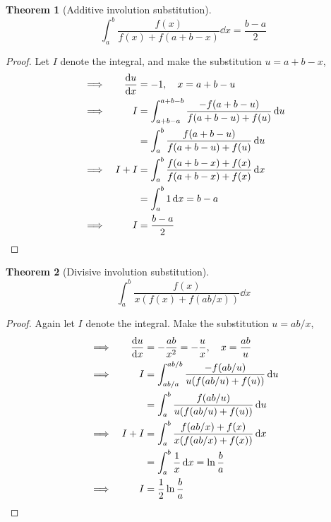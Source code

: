 \documentclass[fleqn,a4paper,11pt]{article}
\newtheorem{theorem}{Theorem}[section]
\begin{document}
    \begin{theorem}[Additive involution substitution]
    \begin{equation*}
    \int_a^b \frac{f(x)}{f(x) + f(a + b - x)} \dd{x} = \frac{b - a} 2
    \end{equation*}
    \end{theorem}
    \begin{proof}
    Let \(I\) denote the integral, and make the substitution \(u = a + b - x\),
    \begin{alignat*}{2}
    &\implies& \dv{u}{x} &= -1, \quad x = a + b - u \\
    &\implies& I &= \int_{a + b - a}^{a + b - b}
                        \frac{-f(a + b - u)}{f(a + b - u) + f(u)} \dd{u} \\
    &&  &= \int_a^b \frac{f(a + b - u)}{f(a + b - u) + f(u)} \dd{u} \\
    &\implies& I + I &= \int_a^b
                        \frac{f(a + b - x) + f(x)}
                             {f(a + b - x) + f(x)} \dd{x} \\
    &&  &= \int_a^b 1 \dd{x} = b - a \\
    &\implies& I &= \frac{b - a} 2 \tag*{\qedhere}
    \end{alignat*}
    \end{proof}
    \begin{theorem}[Divisive involution substitution]
    \begin{equation*}
    \int_a^b \frac{f(x)}{x(f(x) + f(ab / x))} \dd{x}
    \end{equation*}
    \end{theorem}
    \begin{proof}
    Again let \(I\) denote the integral. Make the substitution \(u = ab / x\),
    \begin{alignat*}{2}
    &\implies& \dv{u}{x} &= -\frac{ab}{x^2} = -\frac ux, \quad x = \frac{ab}u \\
    &\implies& I &= \int_{ab/a}^{ab/b} \frac{-f(ab / u)}{u(f(ab / u) + f(u))}
        \dd{u} \\
    && &= \int_a^b \frac{f(ab / u)}{u(f(ab / u) + f(u))} \dd{u} \\
    &\implies& I + I &= \int_a^b \frac{f(ab / x) + f(x)}
                                      {x(f(ab / x) + f(x))} \dd{x} \\
    && &= \int_a^b \frac 1x \dd{x} = \ln \frac ba \\
    &\implies& I &= \frac 12 \ln \frac ba \tag*{\qedhere}
    \end{alignat*}
    \end{proof}
\end{document}
